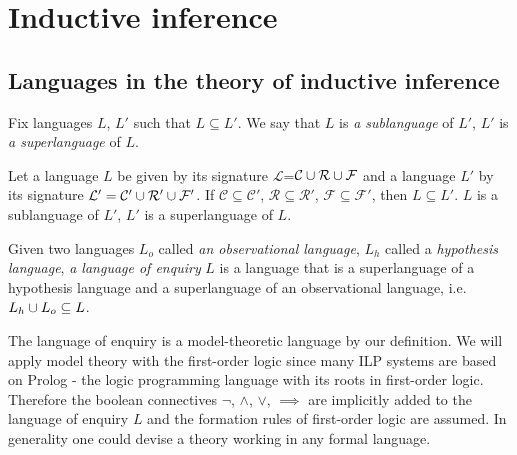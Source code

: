 \section{Inductive inference}
\subsection{Languages in the theory of inductive inference}
\begin{defn}
Fix languages $L$, $L'$ such that $L \subseteq L'$. We say that $L$ is \emph{a sublanguage} of $L'$, $L'$ is \emph{a superlanguage} of $L$.
\end{defn}

\begin{exmp}
Let a language $L$ be given by its signature $\mathcal{L}$=$\mathcal{C} \cup \mathcal{R} \cup \mathcal{F}$ and a language $L'$ by its signature $\mathcal{L}'=\mathcal{C}' \cup \mathcal{R}' \cup \mathcal{F}'$.
If $\mathcal{C} \subseteq \mathcal{C}'$, $\mathcal{R} \subseteq \mathcal{R}'$, $\mathcal{F} \subseteq \mathcal{F}'$, then $L \subseteq L'$. $L$ is a sublanguage of $L'$, $L'$ is a superlanguage of $L$.
\end{exmp}

\begin{defn}
Given two languages $L_o$ called \emph{an observational language}, $L_h$ called a \emph{hypothesis language}, \emph{a language of enquiry} $L$ is a language that is a superlanguage of a hypothesis language and a superlanguage of an observational language, i.e. $L_h \cup L_o \subseteq L$.
\end{defn}

\begin{remark}
The language of enquiry is a model-theoretic language by our definition. We will apply model theory with the first-order logic since many ILP systems are based on Prolog - the logic programming language with its roots in first-order logic. Therefore the boolean connectives $\neg$, $\land$, $\lor$, $\implies$ are implicitly added to the language of enquiry $L$ and the formation rules of first-order logic are assumed. In generality one could devise a theory working in any formal language.
\end{remark}

